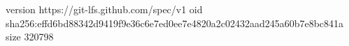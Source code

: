 version https://git-lfs.github.com/spec/v1
oid sha256:effd6bd88342d9419f9e36c6e7ed0ee7e4820a2c02432aad245a60b7e8bc841a
size 320798
